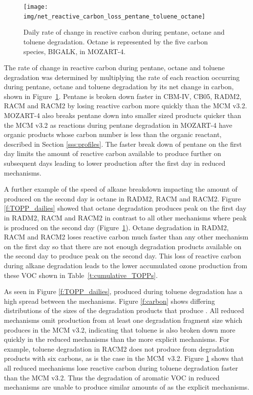 %
\begin{figure}
    \centering
    \caption{Daily rate of change in reactive carbon during pentane, octane and toluene degradation. Octane is represented by the five carbon species, BIGALK, in MOZART-4.}
    \texttt{[image: img/net\_reactive\_carbon\_loss\_pentane\_toluene\_octane]}
    \vspace{-2mm}
    \label{f:net_carbon_loss}
\end{figure}
The rate of change in reactive carbon during pentane, octane and toluene degradation was determined by multiplying the rate of each reaction occurring during pentane, octane and toluene degradation by its net change in carbon, shown in \mbox{Figure \ref{f:net_carbon_loss}}.
Pentane is broken down faster in CBM-IV, CB05, RADM2, RACM and RACM2 by losing reactive carbon more quickly than the MCM v3.2.
MOZART-4 also breaks pentane down into smaller sized products quicker than the MCM v3.2 as reactions during pentane degradation in MOZART-4 have organic products whose carbon number is less than the organic reactant, described in Section \ref{sss:profiles}.
The faster break down of pentane on the first day limits the amount of reactive carbon available to produce further  on subsequent days leading to lower  production after the first day in reduced mechanisms.

A further example of the speed of alkane breakdown impacting the amount of  produced on the second day is octane in RADM2, RACM and RACM2.
Figure \ref{f:TOPP_dailies} showed that octane degradation produces peak  on the first day in RADM2, RACM and RACM2 in contrast to all other mechanisms where peak  is produced on the second day (\mbox{Figure \ref{f:net_carbon_loss}}).
Octane degradation in RADM2, RACM and RACM2 loses reactive carbon much faster than any other mechanism on the first day so that there are not enough degradation products available on the second day to produce peak  on the second day.
This loss of reactive carbon during alkane degradation leads to the lower accumulated ozone production from these VOC shown in \mbox{Table \ref{t:cumulative_TOPPs}}.

As seen in Figure \ref{f:TOPP_dailies},  produced during toluene degradation has a high spread between the mechanisms.
Figure \ref{f:carbon} shows differing distributions of the sizes of the degradation products that produce .
All reduced mechanisms omit  production from at least one degradation fragment size which produces  in the MCM v3.2, indicating that toluene is also broken down more quickly in the reduced mechanisms than the more explicit mechanisms.
For example, toluene degradation in RACM2 does not produce  from degradation products with six carbons, as is the case in the \mbox{MCM v3.2}.  
Figure \ref{f:net_carbon_loss} shows that all reduced mechanisms lose reactive carbon during toluene degradation faster than the MCM v3.2.
Thus the degradation of aromatic VOC in reduced mechanisms are unable to produce similar amounts of  as the explicit mechanisms.
